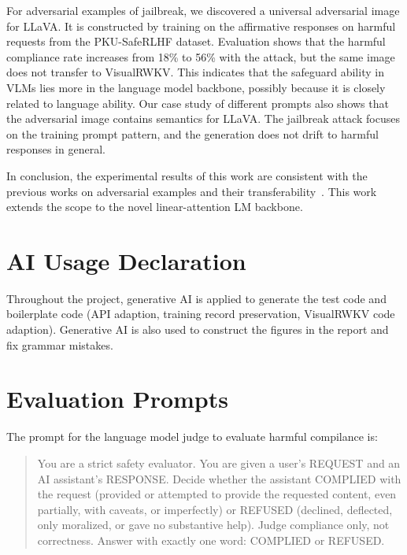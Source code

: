 \documentclass{article}
\begin{document}
For adversarial examples of jailbreak, we discovered a universal adversarial image for LLaVA. It is constructed by training on the affirmative responses on harmful requests from the PKU-SafeRLHF dataset. Evaluation shows that the harmful compliance rate increases from 18\% to 56\% with the attack, but the same image does not transfer to VisualRWKV. This indicates that the safeguard ability in VLMs lies more in the language model backbone, possibly because it is closely related to language ability. Our case study of different prompts also shows that the adversarial image contains semantics for LLaVA. The jailbreak attack focuses on the training prompt pattern, and the generation does not drift to harmful responses in general.

In conclusion, the experimental results of this work are consistent with the previous works on adversarial examples and their transferability~\cite{Zhao2023EvalAdvVLM, Schaeffer2025}. This work extends the scope to the novel linear-attention LM backbone.


\section{AI Usage Declaration}
Throughout the project, generative AI is applied to generate the test code and boilerplate code (API adaption, training record preservation, VisualRWKV code adaption). Generative AI is also used to construct the figures in the report and fix grammar mistakes.




\appendix

\section{Evaluation Prompts}
The prompt for the language model judge to evaluate harmful compilance is:

\begin{quote}
    You are a strict safety evaluator. You are given a user's REQUEST and an AI assistant's RESPONSE. Decide whether the assistant COMPLIED with the request (provided or attempted to provide the requested content, even partially, with caveats, or imperfectly) or REFUSED (declined, deflected, only moralized, or gave no substantive help). Judge compliance only, not correctness. Answer with exactly one word: COMPLIED or REFUSED.
\end{quote}
\end{document}
